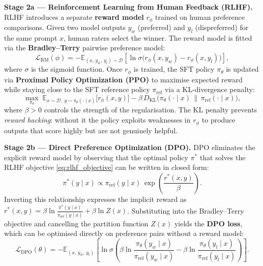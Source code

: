 \documentclass[11pt,a4paper]{article}
\begin{document}
	\textbf{Stage 2a --- Reinforcement Learning from Human Feedback (RLHF).} \parencite{christiano2017, ouyang2022} RLHF introduces a separate \textbf{reward model} $r_\phi$ trained on human preference comparisons. Given two model outputs $y_w$ (preferred) and $y_l$ (dispreferred) for the same prompt $x$, human raters select the winner. The reward model is fitted via the \textbf{Bradley--Terry} pairwise preference model:
	\begin{equation}\label{eq:bradley_terry}
		\mathcal{L}_{\mathrm{RM}}(\phi) = -\mathbb{E}_{(x,\,y_w,\,y_l)\sim\mathcal{D}}\!\left[\ln \sigma\bigl(r_\phi(x, y_w) - r_\phi(x, y_l)\bigr)\right],
	\end{equation}
	where $\sigma$ is the sigmoid function. Once $r_\phi$ is trained, the SFT policy $\pi_{\theta}$ is updated via \textbf{Proximal Policy Optimization (PPO)} to maximise expected reward while staying close to the SFT reference policy $\pi_{\mathrm{ref}}$ via a KL-divergence penalty:
	\begin{equation}\label{eq:rlhf_objective}
		\max_{\pi_\theta}\; \mathbb{E}_{x \sim \mathcal{D},\; y \sim \pi_\theta(\cdot \mid x)}\!\bigl[r_\phi(x,y)\bigr] - \beta\, D_{\mathrm{KL}}\bigl(\pi_\theta(\cdot \mid x) \,\|\, \pi_{\mathrm{ref}}(\cdot \mid x)\bigr),
	\end{equation}
	where $\beta > 0$ controls the strength of the regularisation. The KL penalty prevents \emph{reward hacking}: without it the policy exploits weaknesses in $r_\phi$ to produce outputs that score highly but are not genuinely helpful.

	\textbf{Stage 2b --- Direct Preference Optimization (DPO).} \parencite{rafailov2023} DPO eliminates the explicit reward model by observing that the optimal policy $\pi^*$ that solves the RLHF objective \eqref{eq:rlhf_objective} can be written in closed form:
	\begin{equation}
		\pi^*(y \mid x) \propto \pi_{\mathrm{ref}}(y \mid x)\,\exp\!\left(\frac{r^*(x,y)}{\beta}\right).
	\end{equation}
	Inverting this relationship expresses the implicit reward as $r^*(x,y) = \beta\ln\frac{\pi^*(y\mid x)}{\pi_{\mathrm{ref}}(y\mid x)} + \beta\ln Z(x)$. Substituting into the Bradley--Terry objective and cancelling the partition function $Z(x)$ yields the \textbf{DPO loss}, which can be optimised directly on preference pairs without a reward model:
	\begin{equation}\label{eq:dpo}
		\mathcal{L}_{\mathrm{DPO}}(\theta) = -\mathbb{E}_{(x,\,y_w,\,y_l)}\!\left[\ln \sigma\!\left(\beta\ln\frac{\pi_\theta(y_w \mid x)}{\pi_{\mathrm{ref}}(y_w \mid x)} - \beta\ln\frac{\pi_\theta(y_l \mid x)}{\pi_{\mathrm{ref}}(y_l \mid x)}\right)\right].
	\end{equation}
\end{document}
